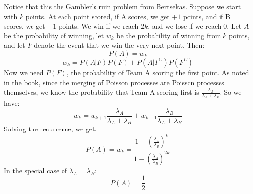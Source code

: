 \begin{enumerate}
    Notice that this the Gambler's ruin problem from Bertsekas. Suppose we start with $k$ points. At each point scored, if A scores, we get $+1$ points, and if B scores, we get $-1$ points. We win if we reach $2k$, and we lose if we reach $0$. Let $A$ be the probability of winning, let $w_k$ be the probability of winning from $k$ points, and let $F$ denote the event that we win the very next point. Then:
    $$P(A) = w_k$$
    $$w_k = P(A|F)P(F) + P(A|F^C)P(F^C)$$
    Now we need $P(F)$, the probability of Team A scoring the first point. As noted in the book, since the merging of Poisson processes are Poisson processes themselves, we know the probability that Team A scoring first is $\frac{\lambda_A}{\lambda_A + \lambda_B}$. So we have:
    $$w_k = w_{k+1} \frac{\lambda_A}{\lambda_A + \lambda_B} + w_{k-1} \frac{\lambda_B}{\lambda_A + \lambda_B}$$
    Solving the recurrence, we get:
    $$P(A) = w_k = \frac{1-(\frac{\lambda_A}{\lambda_B})^k}{1-(\frac{\lambda_A}{\lambda_B})^{2k}}$$
    In the special case of $\lambda_A = \lambda_B$:
    $$P(A) = \frac{1}{2}$$
\end{enumerate}


